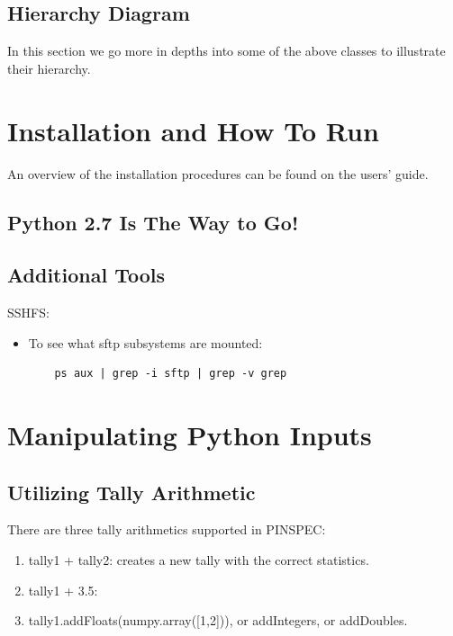 \documentclass[titlepage]{article}
\begin{document}
\subsection{Hierarchy Diagram}
In this section we go more in depths into some of the above classes to illustrate their hierarchy. 



\clearpage
\section{Installation and How To Run} \label{install}
An overview of the installation procedures can be found on the users' guide. 



\clearpage
\subsection{Python 2.7 Is The Way to Go!}


\clearpage
\subsection{Additional Tools}
SSHFS: 
\begin{itemize}

\item To see what sftp subsystems are mounted: 
\begin{verbatim}
    ps aux | grep -i sftp | grep -v grep
\end{verbatim}


\end{itemize}








\clearpage
\section{Manipulating Python Inputs}\label{python}
\subsection{Utilizing Tally Arithmetic}
There are three tally arithmetics supported in PINSPEC: 
\begin{enumerate}
\item tally1 + tally2: creates a new tally with the correct statistics. 
\item tally1 + 3.5:
\item tally1.addFloats(numpy.array([1,2])), or addIntegers, or addDoubles. 
\end{enumerate}
\end{document}
